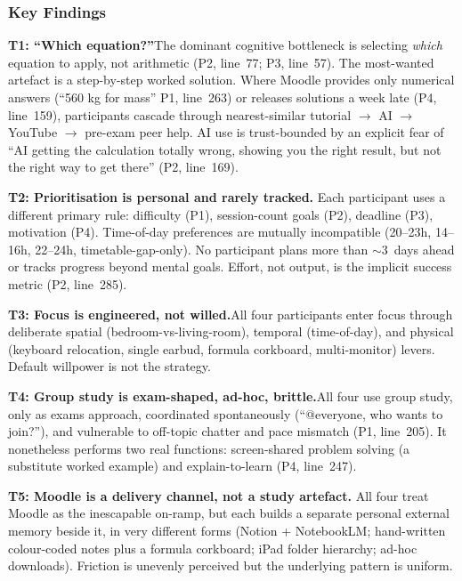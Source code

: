 \documentclass[a4paper,11pt]{article}
\begin{document}
\subsubsection*{Key Findings}

\textbf{T1: ``Which equation?''}\quad The dominant cognitive
bottleneck is selecting \emph{which} equation to apply, not arithmetic
(P2, line~77; P3, line~57). The most-wanted artefact is a
step-by-step worked solution. Where Moodle provides only numerical
answers (``560 kg for mass'' P1, line~263) or releases solutions
a week late (P4, line~159), participants cascade through
nearest-similar tutorial $\rightarrow$ AI $\rightarrow$ YouTube
$\rightarrow$ pre-exam peer help. AI use is trust-bounded by an
explicit fear of ``AI getting the calculation totally wrong, showing
you the right result, but not the right way to get there'' (P2,
line~169).

\textbf{T2: Prioritisation is personal and rarely tracked.}\quad
Each participant uses a different primary rule: difficulty (P1),
session-count goals (P2), deadline (P3), motivation (P4). Time-of-day
preferences are mutually incompatible (20--23h, 14--16h, 22--24h,
timetable-gap-only). No participant plans more than ${\sim}3$~days
ahead or tracks progress beyond mental goals. Effort, not output, is
the implicit success metric (P2, line~285).

\textbf{T3: Focus is engineered, not willed.}\quad All four
participants enter focus through deliberate spatial (bedroom-vs-living-room),
temporal (time-of-day), and physical (keyboard relocation, single
earbud, formula corkboard, multi-monitor) levers. Default willpower is not
the strategy.

\textbf{T4: Group study is exam-shaped, ad-hoc, brittle.}\quad All
four use group study, only as exams approach, coordinated spontaneously
(``@everyone, who wants to join?''), and vulnerable to off-topic
chatter and pace mismatch (P1, line~205). It nonetheless performs two
real functions: screen-shared problem solving (a substitute worked
example) and explain-to-learn (P4, line~247).

\textbf{T5: Moodle is a delivery channel, not a study artefact.}\quad
All four treat Moodle as the inescapable on-ramp, but each builds a
separate personal external memory beside it, in very different forms
(Notion + NotebookLM; hand-written colour-coded notes plus a formula corkboard;
iPad folder hierarchy; ad-hoc downloads). Friction is
unevenly perceived but the underlying pattern is uniform.
\end{document}
